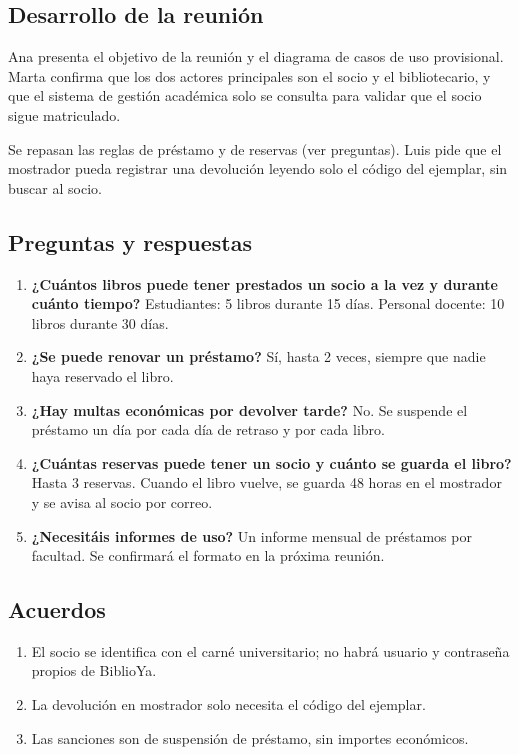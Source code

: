 \documentclass[11pt,a4paper]{article}
\begin{document}
\subsection*{Desarrollo de la reunión}

Ana presenta el objetivo de la reunión y el diagrama de casos de uso provisional. Marta confirma que los dos actores principales son el socio y el bibliotecario, y que el sistema de gestión académica solo se consulta para validar que el socio sigue matriculado.

Se repasan las reglas de préstamo y de reservas (ver preguntas). Luis pide que el mostrador pueda registrar una devolución leyendo solo el código del ejemplar, sin buscar al socio.

\subsection*{Preguntas y respuestas}

\begin{enumerate}
\item \textbf{¿Cuántos libros puede tener prestados un socio a la vez y durante cuánto tiempo?}
Estudiantes: 5 libros durante 15 días. Personal docente: 10 libros durante 30 días.
\item \textbf{¿Se puede renovar un préstamo?}
Sí, hasta 2 veces, siempre que nadie haya reservado el libro.
\item \textbf{¿Hay multas económicas por devolver tarde?}
No. Se suspende el préstamo un día por cada día de retraso y por cada libro.
\item \textbf{¿Cuántas reservas puede tener un socio y cuánto se guarda el libro?}
Hasta 3 reservas. Cuando el libro vuelve, se guarda 48 horas en el mostrador y se avisa al socio por correo.
\item \textbf{¿Necesitáis informes de uso?}
Un informe mensual de préstamos por facultad. Se confirmará el formato en la próxima reunión.
\end{enumerate}

\subsection*{Acuerdos}

\begin{enumerate}
\item El socio se identifica con el carné universitario; no habrá usuario y contraseña propios de BiblioYa.
\item La devolución en mostrador solo necesita el código del ejemplar.
\item Las sanciones son de suspensión de préstamo, sin importes económicos.
\end{enumerate}
\end{document}
